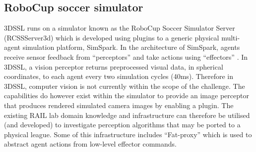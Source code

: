 \documentclass[a4paper,twoside,12pt]{report}
\begin{document}
\subsection{RoboCup soccer simulator}

3DSSL runs on a simulator known as the RoboCup Soccer Simulator Server (RCSSServer3d) which is developed using plugins to a generic physical multi-agent simulation platform, SimSpark. In the architecture of SimSpark, agents receive sensor feedback from ``perceptors'' and take actions using ``effectors'' \citep{simspark}. In 3DSSL, a vision perceptor returns preprocessed visual data, in spherical coordinates, to each agent every two simulation cycles (40ms). Therefore in 3DSSL, computer vision is not currently within the scope of the challenge. The capabilities do however exist within the simulator to provide an image perceptor that produces rendered simulated camera images by enabling a plugin. The existing RAIL lab domain knowledge and infrastructure can therefore be utilised (and developed) to investigate perception algorithms that may be ported to a physical league. Some of this infrastructure includes ``Fat-proxy'' which is used to abstract agent actions from low-level effector commands.
\end{document}

